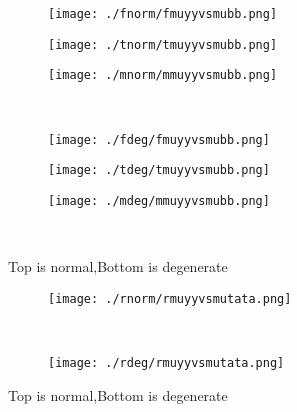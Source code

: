 \documentclass[aps,floats,floatfix,nofootinbib]{revtex4-1}
\begin{document}
\begin{center}
\begin{figure}
\begin{subfigure}{0.3\textwidth}
\texttt{[image: ./fnorm/fmuyyvsmubb.png]}
\label{}
\end{subfigure}
\begin{subfigure}{0.3\textwidth}
\texttt{[image: ./tnorm/tmuyyvsmubb.png]}
\label{}
\end{subfigure}
\begin{subfigure}{0.3\textwidth}
\texttt{[image: ./mnorm/mmuyyvsmubb.png]}
\label{}
\end{subfigure}\\
\begin{subfigure}{0.3\textwidth}
\texttt{[image: ./fdeg/fmuyyvsmubb.png]}
\label{}
\end{subfigure}
\begin{subfigure}{0.3\textwidth}
\texttt{[image: ./tdeg/tmuyyvsmubb.png]}
\label{}
\end{subfigure}
\begin{subfigure}{0.3\textwidth}
\texttt{[image: ./mdeg/mmuyyvsmubb.png]}
\label{}
\end{subfigure}\\
\caption{Top is normal,Bottom is degenerate}
\end{figure}
\end{center}

\begin{center}
\begin{figure}
\begin{subfigure}{0.95\textwidth}
\texttt{[image: ./rnorm/rmuyyvsmutata.png]}
\label{}
\end{subfigure}\\
\begin{subfigure}{0.95\textwidth}
\texttt{[image: ./rdeg/rmuyyvsmutata.png]}
\label{}
\end{subfigure}
\caption{Top is normal,Bottom is degenerate}
\end{figure}
\end{center}
\end{document}
